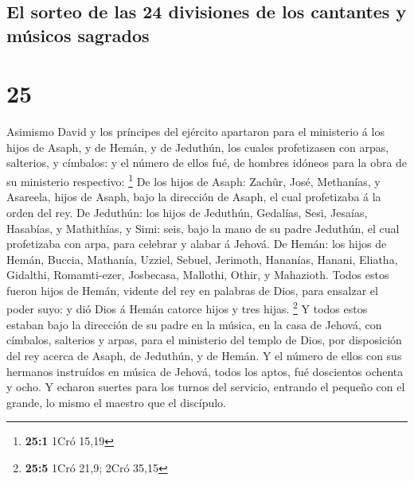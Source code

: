 \hypertarget{el-sorteo-de-las-24-divisiones-de-los-cantantes-y-muxfasicos-sagrados}{%
\subsection{El sorteo de las 24 divisiones de los cantantes y músicos
sagrados}\label{el-sorteo-de-las-24-divisiones-de-los-cantantes-y-muxfasicos-sagrados}}

\hypertarget{section-24}{%
\section{25}\label{section-24}}

 Asimismo David y los príncipes del ejército apartaron para
el ministerio á los hijos de Asaph, y de Hemán, y de Jeduthún, los
cuales profetizasen con arpas, salterios, y címbalos: y el número de
ellos fué, de hombres idóneos para la obra de su ministerio respectivo:
\footnote{\textbf{25:1} 1Cró 15,19}  De los hijos de Asaph:
Zachûr, José, Methanías, y Asareela, hijos de Asaph, bajo la dirección
de Asaph, el cual profetizaba á la orden del rey.  De
Jeduthún: los hijos de Jeduthún, Gedalías, Sesi, Jesaías, Hasabías, y
Mathithías, y Simi: seis, bajo la mano de su padre Jeduthún, el cual
profetizaba con arpa, para celebrar y alabar á Jehová.  De
Hemán: los hijos de Hemán, Buccia, Mathanía, Uzziel, Sebuel, Jerimoth,
Hananías, Hanani, Eliatha, Gidalthi, Romamti-ezer, Josbecasa, Mallothi,
Othir, y Mahazioth.  Todos estos fueron hijos de Hemán,
vidente del rey en palabras de Dios, para ensalzar el poder suyo: y dió
Dios á Hemán catorce hijos y tres hijas. \footnote{\textbf{25:5} 1Cró
  21,9; 2Cró 35,15}  Y todos estos estaban bajo la dirección
de su padre en la música, en la casa de Jehová, con címbalos, salterios
y arpas, para el ministerio del templo de Dios, por disposición del rey
acerca de Asaph, de Jeduthún, y de Hemán.  Y el número de
ellos con sus hermanos instruídos en música de Jehová, todos los aptos,
fué doscientos ochenta y ocho.  Y echaron suertes para los
turnos del servicio, entrando el pequeño con el grande, lo mismo el
maestro que el discípulo.

